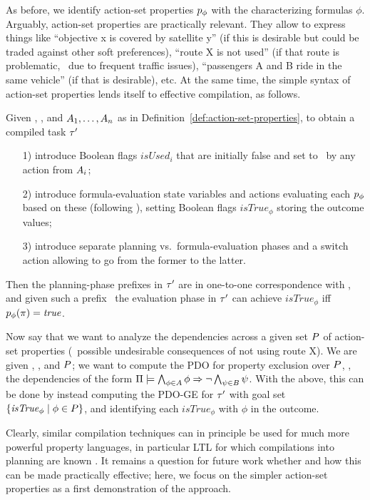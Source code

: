As before, we identify action-set properties $p_\phi$ with the
characterizing formulas $\phi$. Arguably, action-set properties are
practically relevant. They allow to express things like ``objective x
is covered by satellite y'' (if this is desirable but could be traded
against other soft preferences), ``route X is not used'' (if that
route is problematic, \eg\ due to frequent traffic issues),
``passengers A and B ride in the same vehicle'' (if that is
desirable), etc. At the same time, the simple syntax of action-set
properties lends itself to effective compilation, as follows.

Given \task, \plans, and $A_1, \dots, A_n$ as in
Definition~\ref{def:action-set-properties}, to obtain a compiled task
$\tau'$
\begin{itemize}
\item[1)] introduce Boolean flags $\mathit{isUsed}_i$ that are
  initially false and set to \true\ by any action from $A_i$;
\item[2)] introduce formula-evaluation state variables and actions
  evaluating each $p_\phi$ based on these (following
  \cite{gazen:knoblock:ecp-97,nebel:jair-00}), setting Boolean flags
  $\mathit{isTrue}_\phi$ storing the outcome values;
\item[3)] introduce separate planning vs.\ formula-evaluation phases
  and a switch action allowing to go from the former to the latter.
\end{itemize}
Then the planning-phase prefixes in $\tau'$ are in one-to-one
correspondence with \plans, and given such a prefix \plan\ the
evaluation phase in $\tau'$ can achieve $\mathit{isTrue}_\phi$ iff
$p_\phi(\pi) = \mathit{true}$.

Now say that we want to analyze the dependencies across a given set
$P$ of action-set properties (\eg\ possible undesirable
consequences of not using route X). We are given \task, \plans, and
$P$; we want to compute the PDO for property exclusion over
$P$, \ie, the dependencies of the form
$\Pi \models \bigwedge_{\phi \in A} \phi \Rightarrow \neg \bigwedge_{\psi
    \in B} \psi$. With the above, this can be done by instead
computing the PDO-GE for $\tau'$ with goal set
$\{\mathit{isTrue}_\phi \mid \phi \in P\}$, and identifying each
$\mathit{isTrue}_\phi$ with $\phi$ in the outcome.

Clearly, similar compilation techniques can in principle be used for
much more powerful property languages, in particular LTL for which
compilations into planning are known
\cite{edelkamp:icaps-06,baier:etal:ai-09}. It remains a question for
future work whether and how this can be made practically effective;
here, we focus on the simpler action-set properties as a first
demonstration of the approach.





